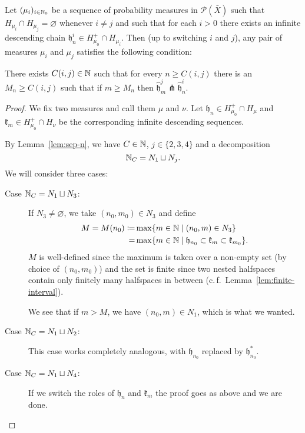 \begin{lemma}[{\cite[Lemma~4.13]{MR3509968}}]
  \label{lem:4.13}
  Let \((\mu_i)_{i \in \mathbb{N}_0}\) be a sequence of probability measures in \(\mathcal{P}(\bar X)\) such that \(H_{\mu_i} \cap H_{\mu_j} = \varnothing\) whenever \(i \neq j\) and such that for each \(i > 0\) there exists an infinite descending chain \(\mathfrak{h}_n^i \in H_{\mu_0}^+ \cap H_{\mu_i}\). Then (up to switching \(i\) and \(j\)), any pair of measures \(\mu_i\) and \(\mu_j\) satisfies the following condition:

  There exists \(C(i,j) \in \mathbb{N}\) such that for every \(n \geq C(i,j)\) there is an \(M_n \geq C(i,j)\) such that if \(m \geq M_n\) then \(\mathfrak{\hat h}^j_m \pitchfork \mathfrak{\hat h}^i_n\). 
\end{lemma}

\begin{proof}
  We fix two measures and call them \(\mu\) and \(\nu\). Let \(\mathfrak{h}_n \in H_{\mu_0}^+ \cap H_\mu\) and \(\mathfrak{k}_m \in H_{\mu_0}^+ \cap H_\nu\) be the corresponding infinite descending sequences.
  
  By Lemma~\ref{lem:sep-n}, we have \(C \in \mathbb{N}\), \(j \in \{2,3,4\}\) and a decomposition
  \[
    \mathbb{N}_C = N_1 \sqcup N_j.
  \]
  We will consider three cases:
  \begin{description}
  \item[Case \(\mathbb{N}_C = N_1 \sqcup N_3\):] If \(N_3 \neq \varnothing\), we take \((n_0, m_0) \in N_3\) and define
    \begin{align*}
      M = M(n_0)  \coloneqq & \max \{m \in \mathbb{N} \mid (n_0, m) \in N_3\}\\
                      = & \max \{m \in \mathbb{N} \mid \mathfrak{h}_{n_0} \subset \mathfrak{k}_m \subset \mathfrak{k}_{m_0}\}.
    \end{align*}
    \(M\) is well-defined since the maximum is taken over a non-empty set (by choice of \((n_0, m_0)\)) and the set is finite since two nested halfspaces contain only finitely many halfspaces in between (c.\,f.\ Lemma~\ref{lem:finite-interval}).

    We see that if \(m > M\), we have \((n_0, m) \in N_1\), which is what we wanted.
  \item[Case \(\mathbb{N}_C = N_1 \sqcup N_2\):] This case works completely analogous, with \(\mathfrak{h}_{n_0}\) replaced by \(\mathfrak{h}_{n_0}^\ast\).
  \item[Case \(\mathbb{N}_C = N_1 \sqcup N_4\):] If we switch the roles of \(\mathfrak{h}_n\) and \(\mathfrak{k}_m\) the proof goes as above and we are done.
  \end{description}
\end{proof}

